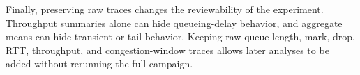 Finally, preserving raw traces changes the reviewability of the experiment. Throughput summaries alone can hide queueing-delay behavior, and aggregate means can hide transient or tail behavior. Keeping raw queue length, mark, drop, RTT, throughput, and congestion-window traces allows later analyses to be added without rerunning the full campaign.
